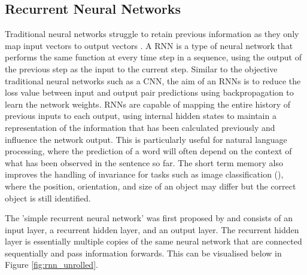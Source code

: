 



\subsection{Recurrent Neural Networks}

Traditional neural networks struggle to retain previous information as they only map input vectors to output vectors \cite{graves_supervised_2012}. A \acrfull{RNN} is a type of neural network that performs the same function at every time step in a sequence, using the output of the previous step as the input to the current step.
Similar to the objective traditional neural networks such as a CNN, the aim of an \acrshort{RNN}s is to reduce the loss value between input and output pair predictions using backpropagation to learn the network weights. 
\acrshort{RNN}s are capable of mapping the entire history of previous inputs to each output, using internal hidden states to maintain a representation of the information that has been calculated previously and influence the network output.
This is particularly useful for natural language processing, where the prediction of a word will often depend on the context of what has been observed in the sentence so far. The short term memory also improves the handling of invariance for tasks such as image classification (\cite{mikolov_recurrent_slides_2010}), where the position, orientation, and size of an object may differ but the correct object is still identified. 






The 'simple recurrent neural network' was first proposed by \cite{elman_original_rnn_1990} and consists of an input layer, a recurrent hidden layer, and an output layer. The recurrent hidden layer is essentially multiple copies of the same neural network that are connected sequentially and pass information forwards. This can be visualised below in Figure \ref{fig:rnn_unrolled}.

